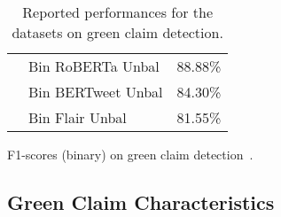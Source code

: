 \begin{table*}[ht]
\begin{subtable}[t]{0.45\textwidth}
{\begin{tabular}{llc}
                \citet{vinicius_woloszyn_towards_2021} & Bin RoBERTa Unbal & 88.88\% \\
                \citet{vinicius_woloszyn_towards_2021} & Bin BERTweet Unbal & 84.30\% \\
                \citet{vinicius_woloszyn_towards_2021} & Bin Flair Unbal & 81.55\% \\
            \bottomrule
        \end{tabular}
        }
        \caption{F1-scores (binary) on green claim detection~\cite{vinicius_woloszyn_towards_2021}.}
        \label{tab:perf_green_claim}
    \end{subtable}
    \caption{Reported performances for the datasets on green claim detection.}
    \label{tab:reported perf claims}
\end{table*}  

\subsection{Green Claim Characteristics}


